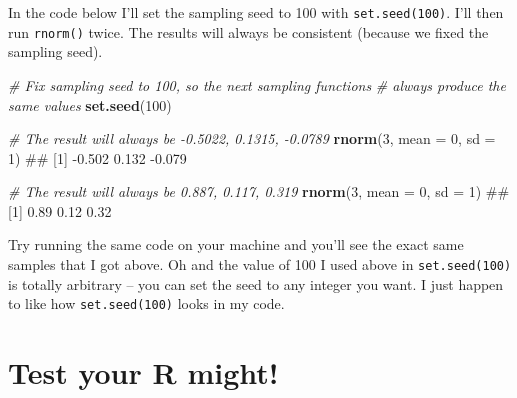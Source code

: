 \documentclass[]{book}
\newenvironment{Shaded}{\begin{snugshade}}{\end{snugshade}}
\newcommand{\KeywordTok}[1]{\textcolor[rgb]{0.13,0.29,0.53}{\textbf{#1}}}
\newcommand{\DataTypeTok}[1]{\textcolor[rgb]{0.13,0.29,0.53}{#1}}
\newcommand{\DecValTok}[1]{\textcolor[rgb]{0.00,0.00,0.81}{#1}}
\newcommand{\CommentTok}[1]{\textcolor[rgb]{0.56,0.35,0.01}{\textit{#1}}}
\newcommand{\NormalTok}[1]{#1}
\theoremstyle{definition}
\theoremstyle{definition}
\theoremstyle{remark}
\begin{document}
In the code below I'll set the sampling seed to 100 with
\texttt{set.seed(100)}. I'll then run \texttt{rnorm()} twice. The
results will always be consistent (because we fixed the sampling seed).

\begin{Shaded}
\begin{Highlighting}[]
\CommentTok{# Fix sampling seed to 100, so the next sampling functions}
\CommentTok{#   always produce the same values}
\KeywordTok{set.seed}\NormalTok{(}\DecValTok{100}\NormalTok{)}

\CommentTok{# The result will always be -0.5022, 0.1315, -0.0789}
\KeywordTok{rnorm}\NormalTok{(}\DecValTok{3}\NormalTok{, }\DataTypeTok{mean =} \DecValTok{0}\NormalTok{, }\DataTypeTok{sd =} \DecValTok{1}\NormalTok{)}
\NormalTok{## [1] -0.502  0.132 -0.079}

\CommentTok{# The result will always be 0.887, 0.117, 0.319}
\KeywordTok{rnorm}\NormalTok{(}\DecValTok{3}\NormalTok{, }\DataTypeTok{mean =} \DecValTok{0}\NormalTok{, }\DataTypeTok{sd =} \DecValTok{1}\NormalTok{)}
\NormalTok{## [1] 0.89 0.12 0.32}
\end{Highlighting}
\end{Shaded}

Try running the same code on your machine and you'll see the exact same
samples that I got above. Oh and the value of 100 I used above in
\texttt{set.seed(100)} is totally arbitrary -- you can set the seed to
any integer you want. I just happen to like how \texttt{set.seed(100)}
looks in my code.

\section{Test your R might!}\label{test-your-r-might-1}
\end{document}
